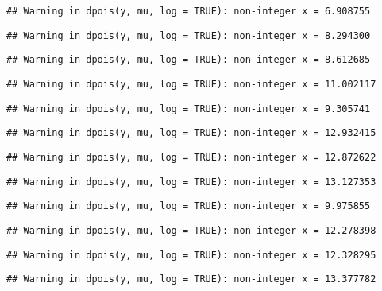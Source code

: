 \documentclass[
]{article}
\begin{document}
\begin{verbatim}
## Warning in dpois(y, mu, log = TRUE): non-integer x = 6.908755
\end{verbatim}

\begin{verbatim}
## Warning in dpois(y, mu, log = TRUE): non-integer x = 8.294300
\end{verbatim}

\begin{verbatim}
## Warning in dpois(y, mu, log = TRUE): non-integer x = 8.612685
\end{verbatim}

\begin{verbatim}
## Warning in dpois(y, mu, log = TRUE): non-integer x = 11.002117
\end{verbatim}

\begin{verbatim}
## Warning in dpois(y, mu, log = TRUE): non-integer x = 9.305741
\end{verbatim}

\begin{verbatim}
## Warning in dpois(y, mu, log = TRUE): non-integer x = 12.932415
\end{verbatim}

\begin{verbatim}
## Warning in dpois(y, mu, log = TRUE): non-integer x = 12.872622
\end{verbatim}

\begin{verbatim}
## Warning in dpois(y, mu, log = TRUE): non-integer x = 13.127353
\end{verbatim}

\begin{verbatim}
## Warning in dpois(y, mu, log = TRUE): non-integer x = 9.975855
\end{verbatim}

\begin{verbatim}
## Warning in dpois(y, mu, log = TRUE): non-integer x = 12.278398
\end{verbatim}

\begin{verbatim}
## Warning in dpois(y, mu, log = TRUE): non-integer x = 12.328295
\end{verbatim}

\begin{verbatim}
## Warning in dpois(y, mu, log = TRUE): non-integer x = 13.377782
\end{verbatim}
\end{document}
